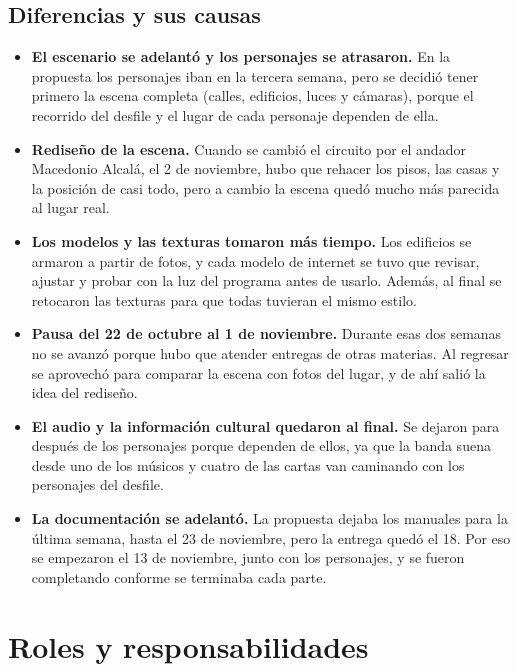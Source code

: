 \documentclass[11pt,a4paper]{article}
\begin{document}
\subsection{Diferencias y sus causas}

\begin{itemize}
  \item \textbf{El escenario se adelantó y los personajes se atrasaron.} En la propuesta los personajes iban en la tercera semana, pero se decidió tener primero la escena completa (calles, edificios, luces y cámaras), porque el recorrido del desfile y el lugar de cada personaje dependen de ella.
  \item \textbf{Rediseño de la escena.} Cuando se cambió el circuito por el andador Macedonio Alcalá, el 2 de noviembre, hubo que rehacer los pisos, las casas y la posición de casi todo, pero a cambio la escena quedó mucho más parecida al lugar real.
  \item \textbf{Los modelos y las texturas tomaron más tiempo.} Los edificios se armaron a partir de fotos, y cada modelo de internet se tuvo que revisar, ajustar y probar con la luz del programa antes de usarlo. Además, al final se retocaron las texturas para que todas tuvieran el mismo estilo.
  \item \textbf{Pausa del 22 de octubre al 1 de noviembre.} Durante esas dos semanas no se avanzó porque hubo que atender entregas de otras materias. Al regresar se aprovechó para comparar la escena con fotos del lugar, y de ahí salió la idea del rediseño.
  \item \textbf{El audio y la información cultural quedaron al final.} Se dejaron para después de los personajes porque dependen de ellos, ya que la banda suena desde uno de los músicos y cuatro de las cartas van caminando con los personajes del desfile.
  \item \textbf{La documentación se adelantó.} La propuesta dejaba los manuales para la última semana, hasta el 23 de noviembre, pero la entrega quedó el 18. Por eso se empezaron el 13 de noviembre, junto con los personajes, y se fueron completando conforme se terminaba cada parte.
\end{itemize}

\section{Roles y responsabilidades}
\label{sec:roles}
\end{document}
